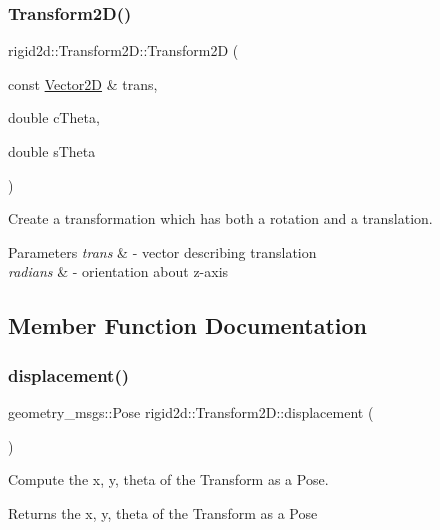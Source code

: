 \subsubsection{\texorpdfstring{Transform2\+D()}{Transform2D()}\hspace{0.1cm}{\footnotesize\ttfamily [4/4]}}
{\footnotesize\ttfamily rigid2d\+::\+Transform2\+D\+::\+Transform2D (\begin{DoxyParamCaption}\item[{const \hyperlink{structrigid2d_1_1Vector2D}{Vector2D} \&}]{trans,  }\item[{double}]{c\+Theta,  }\item[{double}]{s\+Theta }\end{DoxyParamCaption})}



Create a transformation which has both a rotation and a translation. 


\begin{DoxyParams}{Parameters}
{\em trans} & -\/ vector describing translation \\
\hline
{\em radians} & -\/ orientation about z-\/axis \\
\hline
\end{DoxyParams}


\subsection{Member Function Documentation}
\mbox{\label{classrigid2d_1_1Transform2D_aedcb4e4472f57e774ddf21b441c7967f}} 
\subsubsection{\texorpdfstring{displacement()}{displacement()}}
{\footnotesize\ttfamily geometry\+\_\+msgs\+::\+Pose rigid2d\+::\+Transform2\+D\+::displacement (\begin{DoxyParamCaption}{ }\end{DoxyParamCaption})}



Compute the x, y, theta of the Transform as a Pose. 

\begin{DoxyReturn}{Returns}
the x, y, theta of the Transform as a Pose 
\end{DoxyReturn}
\mbox{\label{classrigid2d_1_1Transform2D_ae713c7af107cfd4ba9819f1a16e743d1}} 

